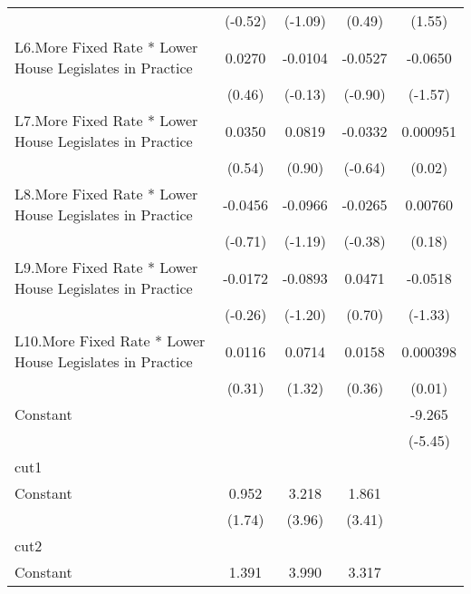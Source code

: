 {\begin{longtable}{l*{4}{c}}
                &  (-0.52)         &  (-1.09)         &   (0.49)         &   (1.55)         \\
\addlinespace
L6.More Fixed Rate * Lower House Legislates in Practice&   0.0270         &  -0.0104         &  -0.0527         &  -0.0650         \\
                &   (0.46)         &  (-0.13)         &  (-0.90)         &  (-1.57)         \\
\addlinespace
L7.More Fixed Rate * Lower House Legislates in Practice&   0.0350         &   0.0819         &  -0.0332         & 0.000951         \\
                &   (0.54)         &   (0.90)         &  (-0.64)         &   (0.02)         \\
\addlinespace
L8.More Fixed Rate * Lower House Legislates in Practice&  -0.0456         &  -0.0966         &  -0.0265         &  0.00760         \\
                &  (-0.71)         &  (-1.19)         &  (-0.38)         &   (0.18)         \\
\addlinespace
L9.More Fixed Rate * Lower House Legislates in Practice&  -0.0172         &  -0.0893         &   0.0471         &  -0.0518         \\
                &  (-0.26)         &  (-1.20)         &   (0.70)         &  (-1.33)         \\
\addlinespace
L10.More Fixed Rate * Lower House Legislates in Practice&   0.0116         &   0.0714         &   0.0158         & 0.000398         \\
                &   (0.31)         &   (1.32)         &   (0.36)         &   (0.01)         \\
\addlinespace
Constant        &                  &                  &                  &   -9.265\sym{***}\\
                &                  &                  &                  &  (-5.45)         \\
\midrule
cut1            &                  &                  &                  &                  \\
Constant        &    0.952         &    3.218\sym{***}&    1.861\sym{***}&                  \\
                &   (1.74)         &   (3.96)         &   (3.41)         &                  \\
\midrule
cut2            &                  &                  &                  &                  \\
Constant        &    1.391\sym{*}  &    3.990\sym{***}&    3.317\sym{***}&                  \\

\end{longtable}}
